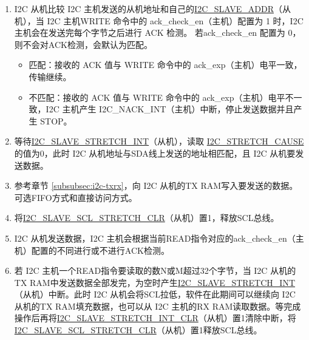 \documentclass[main\_\_CN.tex]{subfiles}
\begin{document}
\begin{enumerate}
\item I2C 从机比较 I2C 主机发送的从机地址和自己的\hyperref[fielddesc:I2CSLAVEADDR]{I2C\_SLAVE\_ADDR}（从机），当 I2C 主机WRITE 命令中的 ack\_check\_en（主机）配置为 1 时，I2C 主机会在发送完每个字节之后进行 ACK 检测。 若ack\_check\_en 配置为 0，则不会对ACK检测，会默认为匹配。
\begin{itemize}
\item 匹配：接收的 ACK 值与 WRITE 命令中的 ack\_exp（主机）电平一致，传输继续。
\item 不匹配：接收的 ACK 值与 WRITE 命令中的 ack\_exp（主机）电平不一致，I2C 主机产生 I2C\_NACK\_INT（主机）中断，停止发送数据并且产生 STOP。
\end{itemize}

\item 等待\hyperref[int:i2c-slave-stretch]{I2C\_SLAVE\_STRETCH\_INT}（从机），读取 \hyperref[fielddesc:I2CSTRETCHCAUSE]{I2C\_STRETCH\_CAUSE} 的值为0，此时 I2C 从机地址与SDA线上发送的地址相匹配，且 I2C 从机要发送数据。

\item 参考章节 \ref{subsubsec:i2c-txrx}，向 I2C 从机的TX RAM写入要发送的数据。可选FIFO方式和直接访问方式。
\item 将\hyperref[fielddesc:I2CSLAVESCLSTRETCHCLR]{I2C\_SLAVE\_SCL\_STRETCH\_CLR}（从机）置1，释放SCL总线。


\item I2C 从机发送数据，I2C 主机会根据当前READ指令对应的ack\_check\_en（主机）配置的不同进行或不进行ACK检测。
\item 若 I2C 主机一个READ指令要读取的数N或M超过32个字节，当 I2C 从机的TX RAM中发送数据全部发完，为空时产生\hyperref[int:i2c-slave-stretch]{I2C\_SLAVE\_STRETCH\_INT}（从机）中断。此时 I2C 从机会将SCL拉低，软件在此期间可以继续向 I2C 从机的TX RAM填充数据，也可以从 I2C 主机的RX RAM读取数据。等完成操作后再将\hyperref[fielddesc:I2CSLAVESTRETCHINTCLR]{I2C\_SLAVE\_STRETCH\_INT\_CLR}（从机）置1清除中断，将 \hyperref[fielddesc:I2CSLAVESCLSTRETCHCLR]{I2C\_SLAVE\_SCL\_STRETCH\_CLR}（从机）置1释放SCL总线。


\end{enumerate}
\end{document}
